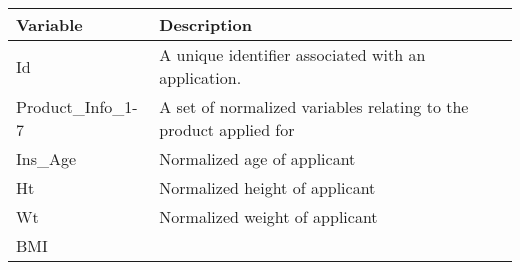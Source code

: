 \documentclass[11pt]{article}
\begin{document}
\begin{longtable}[]{@{}ll@{}}
\toprule
\begin{minipage}[b]{0.35\columnwidth}\raggedright\strut
Variable\strut
\end{minipage} & \begin{minipage}[b]{0.59\columnwidth}\raggedright\strut
Description\strut
\end{minipage}\tabularnewline
\midrule
\endhead
\begin{minipage}[t]{0.35\columnwidth}\raggedright\strut
Id\strut
\end{minipage} & \begin{minipage}[t]{0.59\columnwidth}\raggedright\strut
A unique identifier associated with an application.\strut
\end{minipage}\tabularnewline
\begin{minipage}[t]{0.35\columnwidth}\raggedright\strut
Product\_Info\_1-7\strut
\end{minipage} & \begin{minipage}[t]{0.59\columnwidth}\raggedright\strut
A set of normalized variables relating to the product applied for\strut
\end{minipage}\tabularnewline
\begin{minipage}[t]{0.35\columnwidth}\raggedright\strut
Ins\_Age\strut
\end{minipage} & \begin{minipage}[t]{0.59\columnwidth}\raggedright\strut
Normalized age of applicant\strut
\end{minipage}\tabularnewline
\begin{minipage}[t]{0.35\columnwidth}\raggedright\strut
Ht\strut
\end{minipage} & \begin{minipage}[t]{0.59\columnwidth}\raggedright\strut
Normalized height of applicant\strut
\end{minipage}\tabularnewline
\begin{minipage}[t]{0.35\columnwidth}\raggedright\strut
Wt\strut
\end{minipage} & \begin{minipage}[t]{0.59\columnwidth}\raggedright\strut
Normalized weight of applicant\strut
\end{minipage}\tabularnewline
\begin{minipage}[t]{0.35\columnwidth}\raggedright\strut
BMI\strut
\end{minipage} & \begin{minipage}[t]{0.59\columnwidth}\raggedright\strut

\end{minipage}
\end{longtable}
\end{document}

